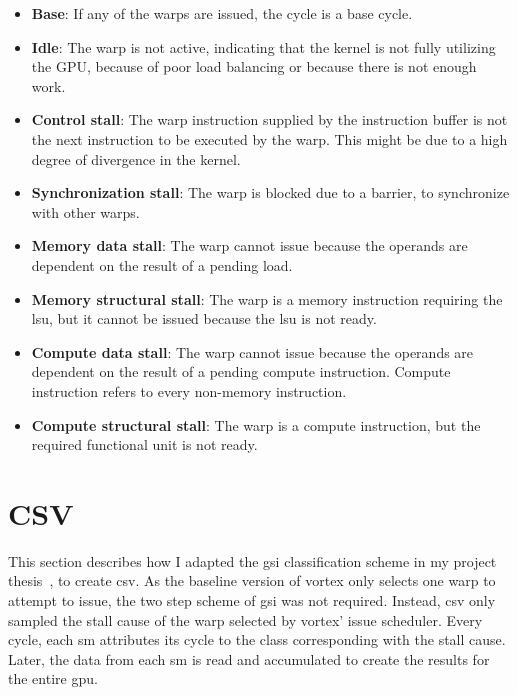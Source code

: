 \begin{itemize}
    \item \textbf{Base}: If any of the warps are issued, the cycle is a base cycle.
    \item \textbf{Idle}: The warp is not active, indicating that the kernel is not fully utilizing the GPU, because of poor load balancing or because there is not enough work.
    \item \textbf{Control stall}: The warp instruction supplied by the instruction buffer is not the next instruction to be executed by the warp. This might be due to a high degree of divergence in the kernel.
    \item \textbf{Synchronization stall}: The warp is blocked due to a barrier, to synchronize with other warps.
    \item \textbf{Memory data stall}: The warp cannot issue because the operands are dependent on the result of a pending load.
    \item \textbf{Memory structural stall}: The warp is a memory instruction requiring the \acrshort{lsu}, but it cannot be issued because the \acrshort{lsu} is not ready.
    \item \textbf{Compute data stall}: The warp cannot issue because the operands are dependent on the result of a pending compute instruction. Compute instruction refers to every non-memory instruction. 
    \item \textbf{Compute structural stall}: The warp is a compute instruction, but the required functional unit is not ready.
\end{itemize}


\section{CSV} \label{sec:csv}

This section describes how I adapted the \acrshort{gsi} classification scheme in my project thesis~\cite{Aurud_Project}, to create \acrshort{csv}. As the baseline version of \Gls{vortex} only selects one warp to attempt to issue, the two step scheme of \acrshort{gsi} was not required. Instead, \acrshort{csv} only sampled the stall cause of the warp selected by \Gls{vortex}' issue scheduler. Every cycle, each \acrshort{sm} attributes its cycle to the class corresponding with the stall cause. Later, the data from each \acrshort{sm} is read and accumulated to create the results for the entire \acrshort{gpu}.

